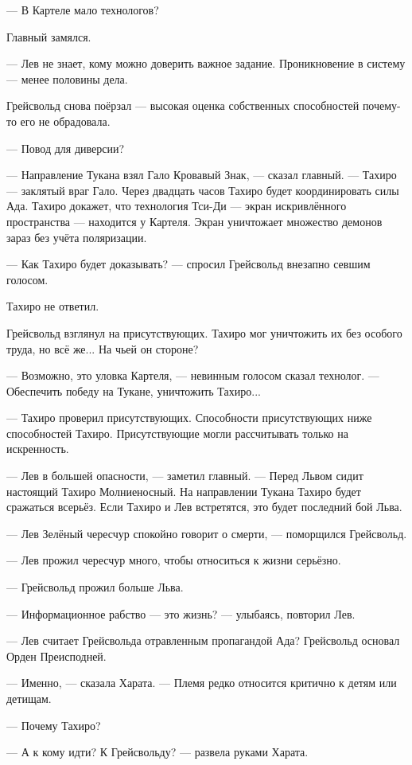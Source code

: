 --- В Картеле мало технологов?

Главный замялся.

--- Лев не знает, кому можно доверить важное задание.
Проникновение в систему --- менее половины дела.

Грейсвольд снова поёрзал --- высокая оценка собственных способностей почему-то его не обрадовала.

--- Повод для диверсии?

--- Направление Тукана взял Гало Кровавый Знак, --- сказал главный.
--- Тахиро --- заклятый враг Гало.
Через двадцать часов Тахиро будет координировать силы Ада.
Тахиро докажет, что технология Тси-Ди --- экран искривлённого пространства --- находится у Картеля.
Экран уничтожает множество демонов зараз без учёта поляризации.

--- Как Тахиро будет доказывать? --- спросил Грейсвольд внезапно севшим голосом.

Тахиро не ответил.

Грейсвольд взглянул на присутствующих.
Тахиро мог уничтожить их без особого труда, но всё же...
На чьей он стороне?

--- Возможно, это уловка Картеля, --- невинным голосом сказал технолог.
--- Обеспечить победу на Тукане, уничтожить Тахиро...

--- Тахиро проверил присутствующих.
Способности присутствующих ниже способностей Тахиро.
Присутствующие могли рассчитывать только на искренность.

--- Лев в большей опасности, --- заметил главный.
--- Перед Львом сидит настоящий Тахиро Молниеносный.
На направлении Тукана Тахиро будет сражаться всерьёз.
Если Тахиро и Лев встретятся, это будет последний бой Льва.

--- Лев Зелёный чересчур спокойно говорит о смерти, --- поморщился Грейсвольд.

--- Лев прожил чересчур много, чтобы относиться к жизни серьёзно.

--- Грейсвольд прожил больше Льва.

--- Информационное рабство --- это жизнь? --- улыбаясь, повторил Лев.

--- Лев считает Грейсвольда отравленным пропагандой Ада?
Грейсвольд основал Орден Преисподней.

--- Именно, --- сказала Харата.
--- Племя редко относится критично к детям или детищам.

--- Почему Тахиро?

--- А к кому идти?
К Грейсвольду? --- развела руками Харата.

